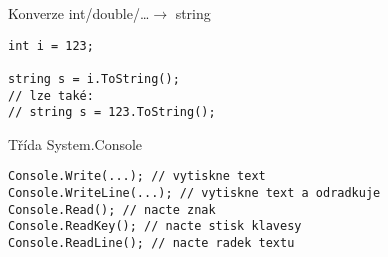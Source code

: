 \begin{frame}[fragile]
\begin{exampleblock}{Konverze int/double/\ldots $\rightarrow$ string}
\begin{lstlisting}
int i = 123;

string s = i.ToString();
// lze také:
// string s = 123.ToString();
\end{lstlisting}
\end{exampleblock}
\end{frame}


\begin{frame}[fragile]
\begin{exampleblock}{Třída System.Console}
\begin{lstlisting}
Console.Write(...); // vytiskne text
Console.WriteLine(...); // vytiskne text a odradkuje
Console.Read(); // nacte znak
Console.ReadKey(); // nacte stisk klavesy
Console.ReadLine(); // nacte radek textu
\end{lstlisting}
\end{exampleblock}
\end{frame}
